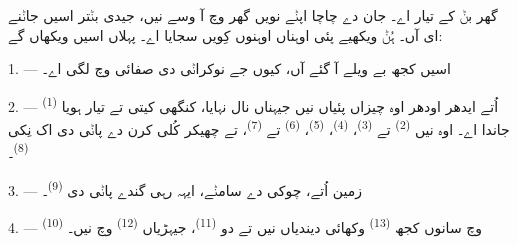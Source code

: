%
%

\VUsaut{6.0mm}
\VUsaut{1.4mm}
\VUsaut{0.4mm}
\VUsaut{2.2mm}

گھر بݨ کے تیار اے۔ جان دے چاچا اپݨے نویں گھر وچ آ وسے نیں، جیدی بݨتر اسیں جاݨنے
ای آں۔ ہُݨ ویکھیے پئی اوہناں اوہنوں کِویں سجایا اے۔ پہلاں اسیں ویکھاں گے:

\VUsaut{3.0mm}

1. --- اسیں کجھ بے ویلے آ گئے آں، کیوں جے نوکراݨی  دی صفائی وچ لگی
اے۔

2. ---  \textsuperscript{(1)} اُتے ایدھر اودھر اوہ
چیزاں پئیاں نیں جیہناں نال نہایا، کنگھی کیتی تے تیار ہویا جاندا اے۔ اوہ نیں
 \textsuperscript{(2)} تے  \textsuperscript{(3)}،
 \textsuperscript{(4)}،  \textsuperscript{(5)}،
 \textsuperscript{(6)} تے  \textsuperscript{(7)}، تے
چھیکر کُلی کرن دے پاݨی دی اک نِکی  \textsuperscript{(8)}۔

3. --- زمین اُتے، چوکی دے سامݨے، ایہہ رہی گندے پاݨی دی 
\textsuperscript{(9)}۔

4. ---  \textsuperscript{(10)} وچ سانوں کجھ 
\textsuperscript{(13)} وکھائی دیندیاں نیں تے دو 
\textsuperscript{(11)}، جیہڑیاں  \textsuperscript{(12)} وچ نیں۔

